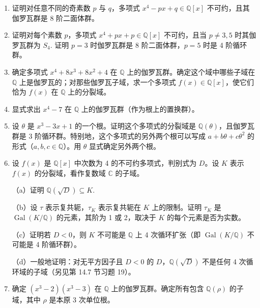 \begin{enumerate}
（ii）\(G \cong C\)，即 4 阶循环群，当且仅当 \(b(a^2-4b)\) 是 \(\mathbb{Q}\) 中的平方，当且仅当 \(\mathbb{Q}(\alpha\beta) = \mathbb{Q}(\alpha^2)\).

（iii）\(G \cong D_8\)，即 8 阶二面体群，当且仅当 \(b\) 与 \(b(a^2-4b)\) 都不是 \(\mathbb{Q}\) 中的平方，当且仅当 \(\alpha\beta \notin \mathbb{Q}(\alpha^2)\).

\item 证明对任意不同的奇素数 \(p\) 与 \(q\)，多项式 \(x^4-px+q \in \mathbb{Q}[x]\) 不可约，且其伽罗瓦群是 8 阶二面体群。

\item 证明对每个素数 \(p\)，多项式 \(x^4+px+p \in \mathbb{Q}[x]\) 不可约，且当 \(p \neq 3, 5\) 时其伽罗瓦群为 \(S_4\). 证明 \(p = 3\) 时伽罗瓦群是 8 阶二面体群，\(p = 5\) 时是 4 阶循环群。

\item 确定多项式 \(x^4+8x^3+8x^2+4\) 在 \(\mathbb{Q}\) 上的伽罗瓦群。确定这个域中哪些子域在 \(\mathbb{Q}\) 上是伽罗瓦的；对那些伽罗瓦子域，求一个多项式 \(f(x) \in \mathbb{Q}[x]\)，使它们恰为 \(f(x)\) 在 \(\mathbb{Q}\) 上的分裂域。

\item 显式求出 \(x^4-7\) 在 \(\mathbb{Q}\) 上的伽罗瓦群（作为根上的置换群）。

\item 设 \(\theta\) 是 \(x^3-3x+1\) 的一个根。证明这个多项式的分裂域是 \(\mathbb{Q}(\theta)\)，且伽罗瓦群是 3 阶循环群。特别地，这个多项式的另外两个根可以写成 \(a+b\theta+c\theta^2\) 的形式（\(a, b, c \in \mathbb{Q}\)）。用 \(\theta\) 显式确定另外两个根。

\item 设 \(f(x)\) 是 \(\mathbb{Q}[x]\) 中次数为 4 的不可约多项式，判别式为 \(D\)。设 \(K\) 表示 \(f(x)\) 的分裂域，看作复数域 \(\mathbb{C}\) 的子域。

（a）证明 \(\mathbb{Q}(\sqrt{D}) \subseteq K\).

（b）设 \(\tau\) 表示复共轭，\(\tau_K\) 表示复共轭在 \(K\) 上的限制。证明 \(\tau_K\) 是 \(\operatorname{Gal}(K/\mathbb{Q})\) 的元素，其阶为 1 或 2，取决于 \(K\) 的每个元素是否为实数。

（c）证明若 \(D < 0\)，则 \(K\) 不可能是 \(\mathbb{Q}\) 上 4 次循环扩张（即 \(\operatorname{Gal}(K/\mathbb{Q})\) 不可能是 4 阶循环群）。

（d）一般地证明：对无平方因子且 \(D < 0\) 的 \(D\)，\(\mathbb{Q}(\sqrt{D})\) 不是任何 4 次循环域的子域（另见第 14.7 节习题 19）。

\item 确定 \((x^3-2)(x^3-3)\) 在 \(\mathbb{Q}\) 上的伽罗瓦群。确定所有包含 \(\mathbb{Q}(\rho)\) 的子域，其中 \(\rho\) 是本原 3 次单位根。


\end{enumerate}
